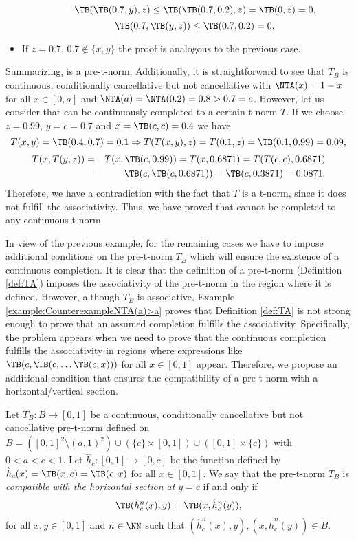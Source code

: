 \begin{example}
\begin{itemize}
\begin{itemize}
			$$ \TB(\TB(0.7,y),z) \leq \TB(\TB(0.7,0.2),z) = \TB(0,z)=0,$$
			$$ \TB(0.7,\TB(y,z)) \leq \TB(0.7,0.2)=0.$$
		\end{itemize}
		\item If $z=0.7$, $ 0.7 \not \in \{x,y\}$ the proof is analogous to the previous case.
	\end{itemize}
	Summarizing, \TB is a pre-t-norm. Additionally, it is straightforward to see that $T_B$ is continuous, conditionally cancellative but not cancellative with $\NTA(x)=1-x$ for all $x \in [0,a]$ and $\NTA(a)=\NTA(0.2)=0.8 > 0.7=c$. However, let us consider that \TB can be continuously completed to a certain t-norm $T$. If we choose $z=0.99$, $y=c=0.7$ and $x=\TB(c,c)=0.4$ we have
	$$T(x,y)=\TB(0.4,0.7)=0.1 \Rightarrow T(T(x,y),z)=T(0.1,z)=\TB(0.1,0.99)=0.09,$$
	\begin{eqnarray*}
		T(x,T(y,z)) &=& T(x,\TB(c,0.99))=T(x,0.6871)= T(T(c,c),0.6871) \\
		&=& \TB(c,\TB(c,0.6871))=\TB(c,0.3871) = 0.0871.
	\end{eqnarray*}
	Therefore, we have a contradiction with the fact that $T$ is a t-norm, since it does not fulfill the associativity. Thus, we have proved that \TB cannot be completed to any continuous t-norm.
\end{example}

In view of the previous example, for the remaining cases we have to impose additional conditions on the pre-t-norm $T_B$ which will ensure the existence of a continuous completion. It is clear that the definition of a pre-t-norm (Definition \ref{def:TA}) imposes the associativity of the pre-t-norm in the region where it is defined. However, although $T_B$ is associative, Example \ref{example:CounterexampleNTA(a)>a} proves that Definition \ref{def:TA} is not strong enough to prove that an assumed completion fulfills the associativity. Specifically, the problem appears when we need to prove that the continuous completion fulfills the associativity in regions where expressions like $\TB(c,\TB(c,\dots \TB(c,x)))$ for all $x \in [0,1]$ appear. Therefore, we propose an additional condition that  ensures the compatibility of a pre-t-norm with a horizontal/vertical section.

\begin{definition}
	Let $T_B : B \to [0,1]$ be a continuous, conditionally cancellative but not cancellative pre-t-norm defined on $B=([0,1]^2 \setminus (a,1)^2) \cup (\{c\} \times [0,1]) \cup ([0,1] \times \{c\})$ with $0<a<c<1$. Let $\hat{h}_c:[0,1] \to [0,c]$ be the function defined by $\hat{h}_c(x)=\TB(x,c) = \TB(c,x)$ for all $x \in [0,1]$. We say that the pre-t-norm $T_B$ is \emph{compatible with the horizontal section at $y=c$} if and only if
	\begin{equation}\label{eq:DefCompatiblehc}
		\TB(\hat{h}_c^{n}(x),y)=\TB(x,\hat{h}_c^{n}(y)),
	\end{equation}
	for all $x,y \in [0,1]$ and $n \in \NN$ such that $(\hat{h}_c^{n}(x),y),(x,\hat{h}_c^{n}(y)) \in B$.
\end{definition}

